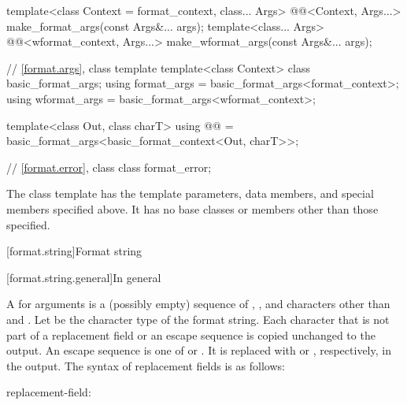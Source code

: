 \begin{codeblock}
{  template<class Context = format_context, class... Args>
    @@<Context, Args...>
      make_format_args(const Args&... args);
  template<class... Args>
    @@<wformat_context, Args...>
      make_wformat_args(const Args&... args);

  // \ref{format.args}, class template 
  template<class Context> class basic_format_args;
  using format_args = basic_format_args<format_context>;
  using wformat_args = basic_format_args<wformat_context>;

  template<class Out, class charT>
    using @@ = basic_format_args<basic_format_context<Out, charT>>;

  // \ref{format.error}, class 
  class format_error;
}
\end{codeblock}


\pnum
The class template 
has the template parameters, data members, and special members specified above. It has no base classes or members other than those specified.

[format.string]{Format string}

[format.string.general]{In general}

\newcommand{\fmtnontermdef}[1]{{\BnfNontermshape#1\itcorr}\textnormal{:}}
\newcommand{\fmtgrammarterm}[1]{\gterm{#1}}

\pnum
A  for arguments  is
a (possibly empty) sequence of
,
,
and characters other than \tcode{\{} and \tcode{\}}.
Let  be the character type of the format string.
Each character that is not part of
a replacement field or an escape sequence
is copied unchanged to the output.
An escape sequence is one of \tcode{\{\{} or \tcode{\}\}}.
It is replaced with \tcode{\{} or \tcode{\}}, respectively, in the output.
The syntax of replacement fields is as follows:

\begin{ncbnf}
\fmtnontermdef{replacement-field}\br
    \terminal{\{}   \terminal{\}}
\end{ncbnf}

